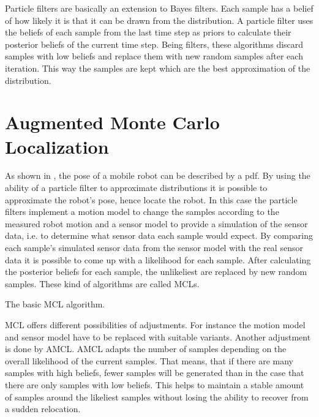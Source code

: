 \documentclass[Thesis.tex]{subfiles}
\begin{document}
Particle filters are basically an extension to Bayes filters. Each sample has a belief of how likely it is that it can be drawn from the distribution. A particle filter uses the beliefs of each sample from the last time step as priors to calculate their posterior beliefs of the current time step. Being filters, these algorithms discard samples with low beliefs and replace them with new random samples after each iteration\cite{ThrunBurgardFox:2005}. This way the samples are kept which are the best approximation of the distribution.

\section{Augmented Monte Carlo Localization}
As shown in , the pose of a mobile robot can be described by a \gls{pdf}. By using the ability of a particle filter to approximate distributions it is possible to approximate the robot's pose, hence locate the robot. In this case the particle filters implement a motion model to change the samples according to the measured robot motion and a sensor model to provide a simulation of the sensor data, i.e. to determine what sensor data each sample would expect. By comparing each sample's simulated sensor data from the sensor model with the real sensor data it is possible to come up with a likelihood for each sample. After calculating the posterior beliefs for each sample, the unlikeliest are replaced by new random samples. These kind of algorithms are called \glspl{MCL}.

\begin{algorithm}
\label{alg:mcl}
\caption[\acrlong{MCL}]{The basic \gls{MCL} algorithm.}
\end{algorithm}

\gls{MCL} offers different possibilities of adjustments. For instance the motion model and sensor model have to be replaced with suitable variants. Another adjustment is done by \gls{AMCL}. \gls{AMCL} adapts the number of samples depending on the overall likelihood of the current samples. That means, that if there are many samples with high beliefs, fewer samples will be generated than in the case that there are only samples with low beliefs. This helps to maintain a stable amount of samples around the likeliest samples without losing the ability to recover from a sudden relocation\cite{ThrunBurgardFox:2005}.
\end{document}
